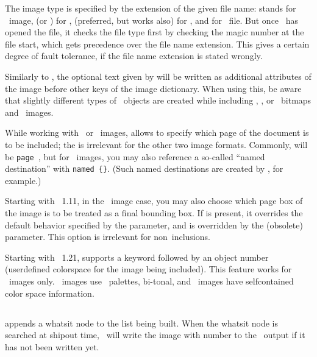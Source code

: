 \documentclass{pdftexmanual}
\begin{document}
The image type is specified by the extension of the given file name:
 stands for \PNG\ image,  (or ) for
\JPEG,  (preferred, but  works also) for
\JBIGTWO, and  for \PDF\ file. But once \PDFTEX\ has opened
the file, it checks the file type first by checking the magic number at
the file start, which gets precedence over the file name extension. This
gives a certain degree of fault tolerance, if the file name extension is
stated wrongly.

Similarly to , the optional text given by  will be written as additional attributes of the image before other
keys of the image dictionary. When using this, be aware that slightly
different types of \PDF\ objects are created while including \PNG,
\JPEG, or \ bitmaps and \PDF\ images.

While working with \PDF\ or \ images,  allows
to specify which page of the document is to be included; the
 is irrelevant for the other two image formats.
Commonly,  will be {\tt page }, but for \PDF\ images, you may also reference a so-called
``named destination'' with {\tt named \{\}}.
(Such named destinations are created by , for example.)

Starting with \PDFTEX\ 1.11, in the \PDF\ image case, you may also
choose which page box of the image is to be treated as a final bounding
box. If  is present, it overrides the default
behavior specified by the  parameter, and is overridden
by the (obsolete)  parameter. This option is
irrelevant for non\hyph \PDF\ inclusions.

Starting with \PDFTEX\ 1.21,  supports a 
keyword followed by an object number (user\hyph defined colorspace for
the image being included). This feature works for \JPEG\ images only.
\PNG\ images use \RGB\ palettes,  bi-tonal, and \PDF\ images have
self\hyph contained color space information.

\subsection{}

 appends a whatsit node to the list being built. When
the whatsit node is searched at shipout time, \PDFTEX\ will write the image
with number  to the \PDF\ output if it has not been
written yet.
\end{document}
